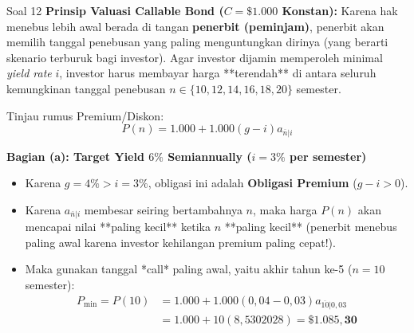 \documentclass[11pt,a4paper]{article}
\begin{document}
\begin{solutionbox}{Soal 12}
\textbf{Prinsip Valuasi Callable Bond ($C = \$1.000$ Konstan):}
Karena hak menebus lebih awal berada di tangan \textbf{penerbit (peminjam)}, penerbit akan memilih tanggal penebusan yang paling menguntungkan dirinya (yang berarti skenario terburuk bagi investor). Agar investor dijamin memperoleh minimal \textit{yield rate} $i$, investor harus membayar harga **terendah** di antara seluruh kemungkinan tanggal penebusan $n \in \{10, 12, 14, 16, 18, 20\}$ semester.

Tinjau rumus Premium/Diskon:
\begin{equation*}
    P(n) = 1.000 + 1.000(g - i) a_{\overline{n}|i}
\end{equation*}

\textbf{Bagian (a): Target Yield $6\%$ Semiannually ($i = 3\%$ per semester)}
\begin{itemize}
    \item Karena $g = 4\% > i = 3\%$, obligasi ini adalah \textbf{Obligasi Premium} ($g - i > 0$).
    \item Karena $a_{\overline{n}|i}$ membesar seiring bertambahnya $n$, maka harga $P(n)$ akan mencapai nilai **paling kecil** ketika $n$ **paling kecil** (penerbit menebus paling awal karena investor kehilangan premium paling cepat!).
    \item Maka gunakan tanggal *call* paling awal, yaitu akhir tahun ke-5 ($n = 10$ semester):
    \begin{align*}
        P_{\min} = P(10) &= 1.000 + 1.000(0{,}04 - 0{,}03) a_{\overline{10}|0{,}03} \\
                         &= 1.000 + 10(8{,}5302028) = \mathbf{\$1.085{,}30}
    \end{align*}
\end{itemize}


\end{solutionbox}
\end{document}
